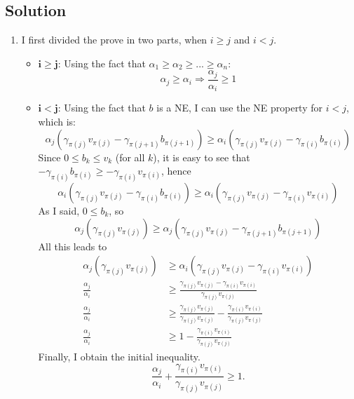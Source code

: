 \documentclass[a4paper, 11pt]{article}
\begin{document}
\subsection*{Solution}
\begin{enumerate}[label=(\alph*)]
    \item I first divided the prove in two parts, when $i \geq j$ and $i < j$.
    \begin{itemize}
        \item $\mathbf{i \geq j}$: Using the fact that $\alpha_1 \geq \alpha_2 \geq ... \geq \alpha_n$:
        \begin{equation*}
            \alpha_j \geq \alpha_i \Rightarrow \frac{\alpha_j}{\alpha_i} \geq 1
        \end{equation*}
        \item $\mathbf{i < j}$: Using the fact that $b$ is a NE, I can use the NE property for $i < j$, which is:
        \begin{equation*}
            \alpha_j(\gamma_{\pi(j)}v_{\pi(j)} - \gamma_{\pi(j+1)}b_{\pi(j+1)}) \geq \alpha_i(\gamma_{\pi(j)}v_{\pi(j)} - \gamma_{\pi(i)}b_{\pi(i)})
        \end{equation*}
        Since $0 \leq b_k \leq v_k$ (for all $k$), it is easy to see that $- \gamma_{\pi(i)}b_{\pi(i)} \geq - \gamma_{\pi(i)}v_{\pi(i)}$, hence
        \begin{equation*}
            \alpha_i(\gamma_{\pi(j)}v_{\pi(j)} - \gamma_{\pi(i)}b_{\pi(i)}) \geq \alpha_i(\gamma_{\pi(j)}v_{\pi(j)} - \gamma_{\pi(i)}v_{\pi(i)})
        \end{equation*}
        As I said, $0 \leq b_k$, so
        \begin{equation*}
            \alpha_j(\gamma_{\pi(j)}v_{\pi(j)}) \geq \alpha_j(\gamma_{\pi(j)}v_{\pi(j)} - \gamma_{\pi(j+1)}b_{\pi(j+1)})
        \end{equation*}
        All this leads to
        \begin{align*}
            \alpha_j(\gamma_{\pi(j)}v_{\pi(j)}) &\geq \alpha_i(\gamma_{\pi(j)}v_{\pi(j)} - \gamma_{\pi(i)}v_{\pi(i)}) \\
            \frac{\alpha_j}{\alpha_i} &\geq \frac{\gamma_{\pi(j)}v_{\pi(j)} - \gamma_{\pi(i)}v_{\pi(i)}}{\gamma_{\pi(j)}v_{\pi(j)}} \\
            \frac{\alpha_j}{\alpha_i} &\geq \frac{\gamma_{\pi(j)}v_{\pi(j)}}{\gamma_{\pi(j)}v_{\pi(j)}} - \frac{\gamma_{\pi(i)}v_{\pi(i)}}{\gamma_{\pi(j)}v_{\pi(j)}} \\
            \frac{\alpha_j}{\alpha_i} &\geq 1 - \frac{\gamma_{\pi(i)}v_{\pi(i)}}{\gamma_{\pi(j)}v_{\pi(j)}}
        \end{align*}
        Finally, I obtain the initial inequality.
        \begin{equation*}
            \frac{\alpha_j}{\alpha_i} + \frac{\gamma_{\pi(i)}v_{\pi(i)}}{\gamma_{\pi(j)}v_{\pi(j)}} \geq 1.
        \end{equation*}

    \end{itemize}
\end{enumerate}
\end{document}
